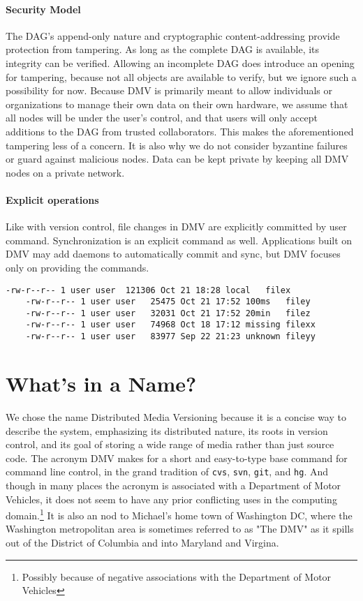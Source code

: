 \paragraph{Security Model}

The DAG's append-only nature and cryptographic content-addressing provide
protection from tampering. As long as the complete DAG is available, its
integrity can be verified. Allowing an incomplete DAG does introduce an opening
for tampering, because not all objects are available to verify, but we ignore
such a possibility for now. Because DMV is primarily meant to allow individuals
or organizations to manage their own data on their own hardware, we assume that
all nodes will be under the user's control, and that users will only accept
additions to the DAG from trusted collaborators. This makes the aforementioned
tampering less of a concern. It is also why we do not consider byzantine
failures or guard against malicious nodes. Data can be kept private by keeping
all DMV nodes on a private network.


\paragraph{Explicit operations}

Like with version control, file changes in DMV are explicitly committed by user
command. Synchronization is an explicit command as well. Applications built on
DMV may add daemons to automatically commit and sync, but DMV focuses only on
providing the commands.



\begin{lstlisting}[float,caption=Example ls output]
    -rw-r--r-- 1 user user  121306 Oct 21 18:28 local   filex
    -rw-r--r-- 1 user user   25475 Oct 21 17:52 100ms   filey
    -rw-r--r-- 1 user user   32031 Oct 21 17:52 20min   filez
    -rw-r--r-- 1 user user   74968 Oct 18 17:12 missing filexx
    -rw-r--r-- 1 user user   83977 Sep 22 21:23 unknown fileyy
\end{lstlisting}



\section{What's in a Name?}

We chose the name Distributed Media Versioning because it is a concise way to
describe the system, emphasizing its distributed nature, its roots in version
control, and its goal of storing a wide range of media rather than just source
code. The acronym DMV makes for a short and easy-to-type base command for
command line control, in the grand tradition of \lstinline{cvs},
\lstinline{svn}, \lstinline{git}, and \lstinline{hg}. And though in many places
the acronym is associated with a Department of Motor Vehicles, it does not seem
to have any prior conflicting uses in the computing domain.\footnote{Possibly
because of negative associations with the Department of Motor Vehicles} It is
also an nod to Michael's home town of Washington DC, where the Washington
metropolitan area is sometimes referred to as "The DMV" as it spills out of the
District of Columbia and into Maryland and Virgina.
